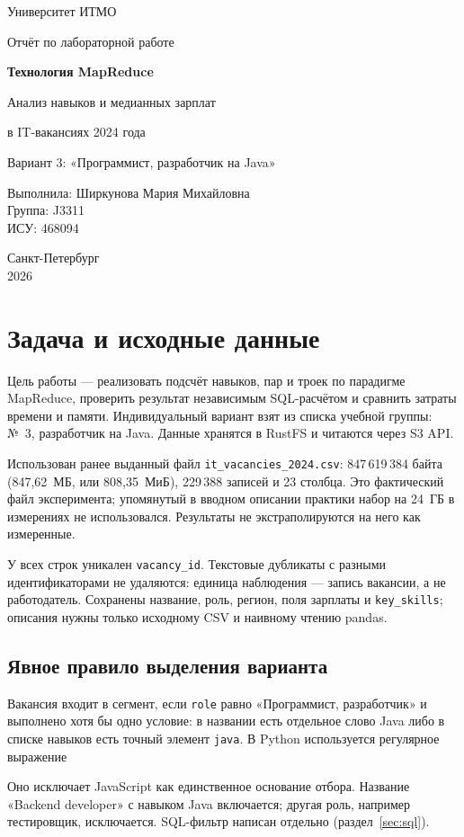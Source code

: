 \documentclass[11pt,a4paper]{article}
\begin{document}
\begin{titlepage}
\centering
Университет ИТМО\par
\vspace{3.4cm}
{\Large Отчёт по лабораторной работе\par}
\vspace{0.6cm}
{\LARGE\bfseries Технология MapReduce\par}
\vspace{0.7cm}
{\large Анализ навыков и медианных зарплат\par
в IT-вакансиях 2024 года\par}
\vspace{0.7cm}
Вариант 3: «Программист, разработчик на Java»\par
\vspace{2.2cm}
\begin{flushright}
Выполнила: Ширкунова Мария Михайловна\\
Группа: J3311\\
ИСУ: 468094
\end{flushright}
\vfill Санкт-Петербург\\2026
\end{titlepage}

\section{Задача и исходные данные}
Цель работы --- реализовать подсчёт навыков, пар и троек по парадигме MapReduce, проверить результат независимым SQL-расчётом и сравнить затраты времени и памяти. Индивидуальный вариант взят из списка учебной группы: №~3, разработчик на Java. Данные хранятся в RustFS и читаются через S3 API.

Использован ранее выданный файл \texttt{it\_vacancies\_2024.csv}: 847\,619\,384 байта (847,62~МБ, или 808,35~МиБ), 229\,388 записей и 23 столбца. Это фактический файл эксперимента; упомянутый в вводном описании практики набор на 24~ГБ в измерениях не использовался. Результаты не экстраполируются на него как измеренные.

У всех строк уникален \texttt{vacancy\_id}. Текстовые дубликаты с разными идентификаторами не удаляются: единица наблюдения --- запись вакансии, а не работодатель. Сохранены название, роль, регион, поля зарплаты и \texttt{key\_skills}; описания нужны только исходному CSV и наивному чтению pandas.

\subsection{Явное правило выделения варианта}
Вакансия входит в сегмент, если \texttt{role} равно «Программист, разработчик» и выполнено хотя бы одно условие: в названии есть отдельное слово Java либо в списке навыков есть точный элемент \texttt{java}. В Python используется регулярное выражение
Оно исключает JavaScript как единственное основание отбора. Название «Backend developer» с навыком Java включается; другая роль, например тестировщик, исключается. SQL-фильтр написан отдельно (раздел~\ref{sec:sql}).
\end{document}
